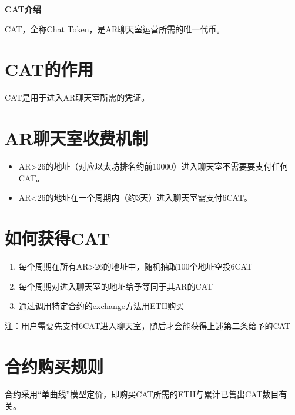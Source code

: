 \documentclass[12pt]{article}
\begin{document}
\pagestyle{empty}
\renewcommand{\contentsname}{目录}
\renewcommand{\abstractname}{摘要}
\renewcommand{\refname}{发表文献}
\renewcommand{\figurename}{图}
\renewcommand{\tablename}{表}
\renewcommand{\baselinestretch}{1.5}
\renewcommand{\appendixname}{附录}
\renewcommand{\proofname}{证明}

\pagecolor{\pcolor}


  \begin{center}
    \vspace*{0.5cm}
    \vspace{0.5cm}
    \textbf{\huge{CAT介绍}}
    \vspace{0.5cm}
    \textbf{}
  \end{center}
\setcounter{page}{0}
\pagestyle{fancy}
\vspace*{0.01cm}
CAT，全称Chat Token，是AR聊天室运营所需的唯一代币。
\section*{CAT的作用}

CAT是用于进入AR聊天室所需的凭证。

\section*{AR聊天室收费机制}
\begin{itemize}
\item AR>26的地址（对应以太坊排名约前10000）进入聊天室不需要要支付任何CAT。
\item AR<26的地址在一个周期内（约3天）进入聊天室需支付$6$CAT。
\end{itemize}
\section*{如何获得CAT}
\begin{enumerate}
\item 每个周期在所有AR>26的地址中，随机抽取100个地址空投$6$CAT
\item 每个周期对进入聊天室的地址给予等同于其AR的CAT
\item 通过调用特定合约的exchange方法用ETH购买
\end{enumerate}
注：用户需要先支付6CAT进入聊天室，随后才会能获得上述第二条给予的CAT

\section*{合约购买规则}
合约采用“单曲线”模型定价，即购买CAT所需的ETH与累计已售出CAT数目有关。
\end{document}
